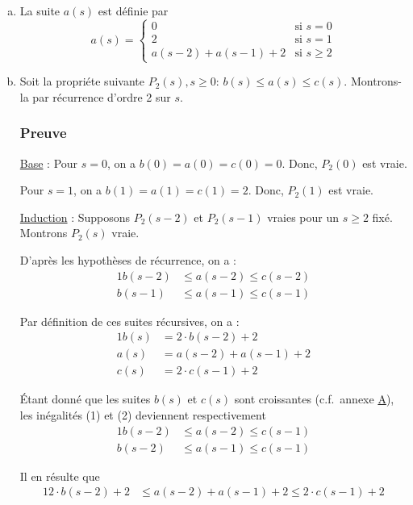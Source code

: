 \documentclass[12pt,a4paper]{article}
\begin{document}
\begin{enumerate}[a)]
\item La suite $a(s)$ est d\'efinie par
\[ a(s) = \begin{cases} 
      0 & \text{si } s = 0 \\
      2 & \text{si } s = 1 \\
      a(s-2) + a(s-1) + 2 & \text{si } s\geq 2 
   \end{cases}
\]

\item Soit la propri\'ete suivante $P_{2}(s), s\geq 0$: $ b(s) \leq a(s) \leq c(s) $.
Montrons-la par r\'ecurrence d'ordre 2 sur $s$. 

\subsubsection*{Preuve}
\underline{Base} : Pour \( s = 0\), on a $b(0) = a(0) = c(0) = 0 $. Donc, $P_{2}(0)$ est vraie.

Pour \( s = 1\), on a $b(1) = a(1) = c(1) = 2 $. Donc, $P_{2}(1)$ est vraie.

\medskip
\underline{Induction} : Supposons \( P_{2}(s-2) \) et \( P_{2}(s-1) \) vraies pour un \( s \geq 2 \) fix\'e. Montrons \( P_{2}(s) \) vraie.

D'apr\`es les hypoth\`eses de r\'ecurrence, on a : 
\begin{alignat}{1}
b(s-2) &\leq a(s-2) \leq c(s-2) \\
b(s-1) &\leq a(s-1) \leq c(s-1)
\end{alignat} 

Par d\'efinition de ces suites r\'ecursives, on a :
\begin{alignat}{1}
b(s) &= 2\cdot b(s-2) + 2 \\
a(s) &= a(s-2) + a(s-1) + 2 \\
c(s) &= 2\cdot c(s-1) + 2
\end{alignat}

\'Etant donn\'e que les suites $b(s)$ et $c(s)$ sont croissantes (c.f.\ annexe \hyperref[appendix:suites]{A}), les in\'egalit\'es (1) et (2) deviennent respectivement
\begin{alignat*}{1}
b(s-2) &\leq a(s-2) \leq c(s-1) \\
b(s-2) &\leq a(s-1) \leq c(s-1)
\end{alignat*}

Il en r\'esulte que 
\begin{alignat}{1}
2\cdot b(s-2) + 2 &\leq a(s-2) + a(s-1) + 2 \leq 2\cdot c(s-1) + 2
\end{alignat}


\end{enumerate}
\end{document}
